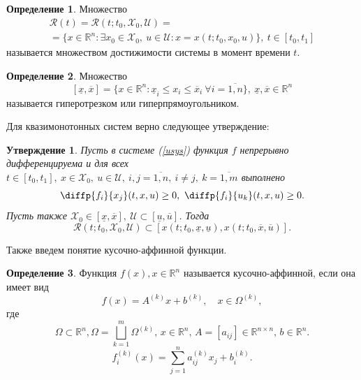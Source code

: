 \documentclass[envcountsect]{beamer}
\newtheorem{rustatement}{Утверждение}
\theoremstyle{definition}
\newtheorem{rudefinition}{Определение}[section]
\begin{document}
	\begin{frame}
		\begin{rudefinition}
			Множество
			\begin{multline*}\mathcal{R}(t) = \mathcal{R}(t; t_0, \mathcal{X}_0, \mathcal{U}) = \\ = \{x \in \mathbb{R}^n: \exists x_0 \in \mathcal{X}_0,\ u \in \mathcal{U}: x = x(t; t_0, x_0, u)\},\ t \in [t_0,t_1]\end{multline*}
			называется множеством достижимости системы в момент времени \(t\).
		\end{rudefinition}
		
		\begin{rudefinition} \label{hr}
			Множество
			\[
			[\underline{x}, \overline{x}] = \{x \in \mathbb{R}^n: \underline{x}_i \le x_i \le \overline{x}_i\ \forall i = \overline{1, n}\},\ \underline{x}, \overline{x} \in \mathbb{R}^n
			\]
			называется гиперотрезком или гиперпрямоугольником.
		\end{rudefinition}
	\end{frame}
	
	\begin{frame}
		Для квазимонотонных систем верно следующее утверждение:
		\begin{rustatement}
			Пусть в системе (\ref{usys}) функция \(f\) непрерывно дифференцируема и для всех \(t \in [t_0,t_1],\ x \in \mathcal{X}_0,\ u \in \mathcal{U},\ i, j = \overline{1, n},\ i \neq j,\ k = \overline{1, m}\) выполнено
			\begin{equation} \label{jakobian}
				\diffp{f_i}{{x_j}}(t, x, u) \ge 0,\ \diffp{f_i}{{u_k}}(t, x, u) \ge 0.
			\end{equation}
			Пусть также \(\mathcal{X}_0 \in [\underline{x}, \overline{x}],\ \mathcal{U} \subset [\underline{u},\overline{u}]\). Тогда
			\[
			\mathcal{R}(t; t_0, \mathcal{X}_0, \mathcal{U}) \subset [x(t; t_0, \underline{x}, \underline{u}), x(t; t_0, \overline{x}, \overline{u})].
			\]
		\end{rustatement}
	\end{frame}
	
	\begin{frame}
		Также введем понятие кусочно-аффинной функции.
		\begin{rudefinition}
			Функция \(f(x), x \in \mathbb{R}^n\) называется кусочно-аффинной, если она имеет вид
			\begin{equation} \label{pwadef}
				f(x) = A^{(k)}x + b^{(k)},\quad x \in \Omega^{(k)},
			\end{equation}
			где
			\[\Omega \subset \mathbb{R}^n, \Omega = \bigsqcup_{k = 1}^m \Omega^{(k)},\, x \in \mathbb{R}^{n},\, A=[a_{ij}] \in \mathbb{R}^{n \times n},\, b \in \mathbb{R}^{n}.\]
			\[f_i^{(k)}(x) = \sum_{j=1}^{n} a_{ij}^{(k)}x_j + b_i^{(k)}.\]
		\end{rudefinition}
	\end{frame}
\end{document}
